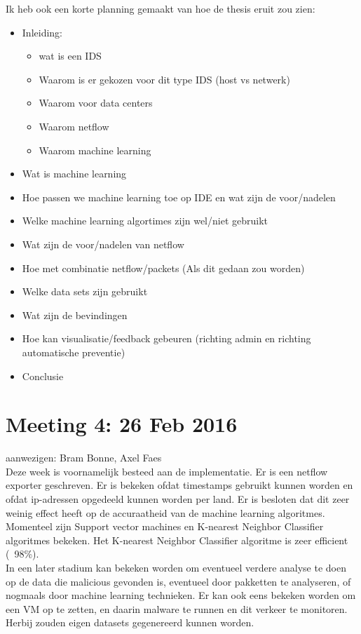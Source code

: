 \noindent Ik heb ook een korte planning gemaakt van hoe de thesis eruit zou zien:
\begin{itemize}  
\item Inleiding:
\begin{itemize}  
    \item wat is een IDS
    \item Waarom is er gekozen voor dit type IDS (host vs netwerk)
    \item Waarom voor data centers
    \item Waarom netflow
    \item Waarom machine learning
\end{itemize}
\item Wat is machine learning
\item Hoe passen we machine learning toe op IDE en wat zijn de voor/nadelen
\item Welke machine learning algortimes zijn wel/niet gebruikt
\item Wat zijn de voor/nadelen van netflow
\item Hoe met combinatie netflow/packets (Als dit gedaan zou worden)
\item Welke data sets zijn gebruikt
\item Wat zijn de bevindingen
\item Hoe kan visualisatie/feedback gebeuren (richting admin en richting automatische preventie)
\item Conclusie
\end{itemize}
\section{Meeting 4: 26 Feb 2016}
aanwezigen: Bram Bonne, Axel Faes\\

\noindent Deze week is voornamelijk besteed aan de implementatie. Er is een netflow exporter geschreven. Er is bekeken ofdat timestamps gebruikt kunnen worden en ofdat ip-adressen opgedeeld kunnen worden per land. Er is besloten dat dit zeer weinig effect heeft op de accuraatheid van de machine learning algoritmes.\\

\noindent Momenteel zijn Support vector machines en K-nearest Neighbor Classifier algoritmes bekeken. Het K-nearest Neighbor Classifier algoritme is zeer efficient (~98\%).\\

\noindent In een later stadium kan bekeken worden om eventueel verdere analyse te doen op de data die malicious gevonden is, eventueel door pakketten te analyseren, of nogmaals door machine learning technieken. Er kan ook eens bekeken worden om een VM op te zetten, en daarin malware te runnen en dit verkeer te monitoren. Herbij zouden eigen datasets gegenereerd kunnen worden.\\

